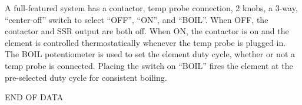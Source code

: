 \documentclass[dvips,12pt]{article}
\begin{document}
A
full-featured system has a contactor, temp probe connection, 2 knobs, a 3-way, ``center-off'' switch to select ``OFF'',
``ON'', and ``BOIL''. When OFF, the contactor and SSR output are both off.
When ON, the contactor is on and the element is controlled thermostatically
whenever the temp probe is plugged in. 
The BOIL potentiometer is used to set the element 
duty cycle, whether or not a temp probe is connected. Placing the switch on
``BOIL'' fires the element at the pre-selected duty cycle for consistent
boiling.

\centering
\vspace{2cm}
END OF DATA
\appendix
\end{document}

